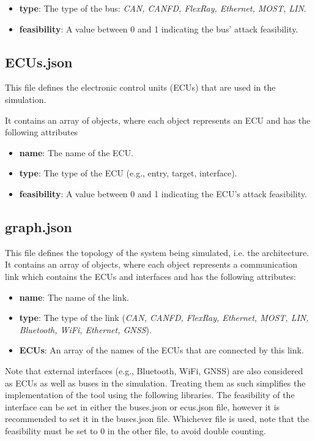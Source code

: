 \begin{itemize}
\item \textbf{type}: The type of the bus: \textit{CAN, CANFD, FlexRay, Ethernet, MOST, LIN}.
\item \textbf{feasibility}: A value between 0 and 1 indicating the bus' attack feasibility.
\end{itemize}

\subsection{ECUs.json}
\label{sec:ECUs}

This file defines the electronic control units (ECUs) that are used in the simulation. 

It contains an array of objects, where each object represents an ECU and has the following attributes

\begin{itemize}
\item \textbf{name}: The name of the ECU.
\item \textbf{type}: The type of the ECU (e.g., entry, target, interface).
\item \textbf{feasibility}: A value between 0 and 1 indicating the ECU's attack feasibility.
\end{itemize}

\subsection{graph.json}
\label{sec:graph}

This file defines the topology of the system being simulated, i.e. the architecture. 
It contains an array of objects, where each object represents a communication link which contains the ECUs and interfaces and has the following attributes:

\begin{itemize}
\item \textbf{name}: The name of the link.
\item \textbf{type}: The type of the link (\textit{CAN, CANFD, FlexRay, Ethernet, MOST, LIN, Bluetooth, WiFi, Ethernet, GNSS}).
\item \textbf{ECUs}: An array of the names of the ECUs that are connected by this link.
\end{itemize}

Note that external interfaces (e.g., Bluetooth, WiFi, GNSS) are also considered as ECUs as well as buses in the simulation.
Treating them as such simplifies the implementation of the tool using the following libraries.
The feasibility of the interface can be set in either the buses.json or ecus.json file, however it is recommended to set it in the buses.json file.
Whichever file is used, note that the feasibility must be set to 0 in the other file, to avoid double counting.


